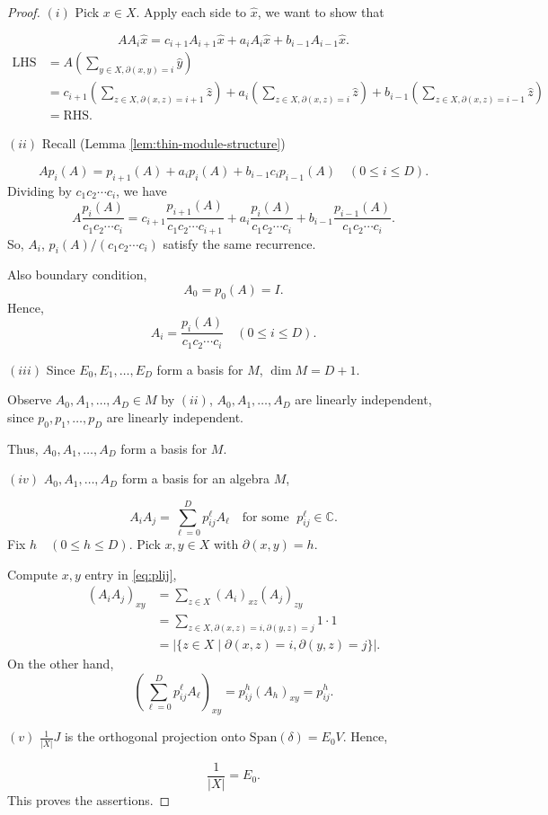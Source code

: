 \documentclass[
]{book}
\theoremstyle{definition}
\theoremstyle{definition}
\theoremstyle{definition}
\theoremstyle{definition}
\theoremstyle{remark}
\begin{document}
\begin{proof}
\leavevmode

\((i)\) Pick \(x\in X\). Apply each side to \(\hat{x}\), we want to show that

\[AA_i \hat{x} = c_{i+1}A_{i+1}\hat{x} + a_iA_i\hat{x} + b_{i-1}A_{i-1}\hat{x}.\]
\begin{align}
\mathrm{LHS} & = A\left(\sum_{y\in X, \partial(x,y) = i}\hat{y}\right)\\
& = c_{i+1}\left(\sum_{z\in X, \partial(x,z) = i+1}\hat{z}\right) + a_i\left(\sum_{z\in X, \partial(x,z) = i}\hat{z}\right) + b_{i-1}\left(\sum_{z\in X, \partial(x,z) = i-1}\hat{z}\right)\\
& = \mathrm{RHS}.
\end{align}

\((ii)\) Recall (Lemma \ref{lem:thin-module-structure})

\[Ap_i(A) = p_{i+1}(A) + a_ip_i(A) + b_{i-1}c_ip_{i-1}(A) \quad (0\leq i\leq D).\]
Dividing by \(c_1c_2\cdots c_i\), we have
\[A\frac{p_i(A)}{c_1c_2\cdots c_i} = c_{i+1}\frac{p_{i+1}(A)}{c_1c_2\cdots c_{i+1}} + a_i\frac{p_i(A)}{c_1c_2\cdots c_i} + b_{i-1}\frac{p_{i-1}(A)}{c_1c_2\cdots c_i}.\]
So, \(A_i\), \(p_i(A)/(c_1c_2\cdots c_i)\) satisfy the same recurrence.

Also boundary condition,
\[A_0 = p_0(A) = I.\]
Hence,
\[A_i = \frac{p_i(A)}{c_1c_2\cdots c_i}\quad (0\leq i\leq D).\]

\((iii)\) Since \(E_0, E_1, \ldots, E_D\) form a basis for \(M\), \(\dim M = D+1\).

Observe \(A_0, A_1, \ldots, A_D\in M\) by \((ii)\),
\(A_0, A_1, \ldots, A_D\) are linearly independent, since \(p_0, p_1, \ldots, p_D\) are linearly independent.

Thus, \(A_0, A_1, \ldots, A_D\) form a basis for \(M\).

\((iv)\) \(A_0, A_1, \ldots, A_D\) form a basis for an algebra \(M\),

\begin{equation}
A_iA_j = \sum_{\ell = 0}^Dp^\ell_{ij}A_\ell \quad \text{for some }\; p^\ell_{ij}\in\mathbb{C}. \label{eq:plij}
\end{equation}
Fix \(h \quad (0\leq h\leq D)\). Pick \(x, y\in X\) with \(\partial(x,y) = h\).

Compute \(x, y\) entry in \eqref{eq:plij},
\begin{align}
(A_iA_j)_{xy} & = \sum_{z\in X}(A_i)_{xz}(A_j)_{zy}\\
& = \sum_{z\in X, \partial(x,z)=i, \partial(y,z)=j} 1\cdot 1\\
& = |\{z\in X\mid \partial(x,z)=i, \partial(y,z)=j\}|.
\end{align}
On the other hand,
\[\left(\sum_{\ell=0}^D p^\ell_{ij} A_\ell\right)_{xy} = p^h_{ij}(A_h)_{xy} = p^h_{ij}.\]

\((v)\) \(\frac{1}{|X|}J\) is the orthogonal projection onto \(\mathrm{Span}(\delta) = E_0V\). Hence,

\[\frac{1}{|X|} = E_0.\]
This proves the assertions.

\end{proof}
\end{document}
